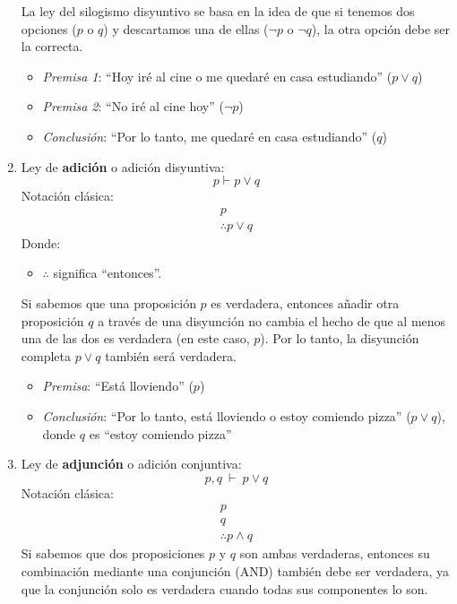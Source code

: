 \begin{enumerate}[label=\alph*)]
	La ley del silogismo disyuntivo se basa en la idea de que si tenemos dos opciones ($p$ o $q$) y descartamos una de ellas ($\neg p$ o $\neg q$), la otra opción debe ser la correcta.
	
	\begin{fmd-example} 
		\begin{itemize}
			\item \textit{Premisa 1}: ``Hoy iré al cine o me quedaré en casa estudiando'' ($p \lor q$)
			\item \textit{Premisa 2}: ``No iré al cine hoy'' ($\neg p$)
			\item \textit{Conclusión}: ``Por lo tanto, me quedaré en casa estudiando'' ($q$)
		\end{itemize}
	\end{fmd-example}
	
	\item Ley de \textbf{adición} o adición disyuntiva: 
	\[ p \vdash p \lor q \]
	Notación clásica:
	\[
	\begin{array}{l}
		p\\ \hline
		\therefore p \lor q
	\end{array}
	\]
	Donde:
	\begin{itemize}
		\item $\therefore$ significa ``entonces''.
	\end{itemize}
	
	Si sabemos que una proposición $p$ es verdadera, entonces añadir otra proposición $q$ a través de una disyunción no cambia el hecho de que al menos una de las dos es verdadera (en este caso, $p$). Por lo tanto, la disyunción completa $p \lor q$ también será verdadera.
	
	\begin{fmd-example}[Adición]
		\begin{itemize}
			\item \textit{Premisa}: ``Está lloviendo'' ($p$)
			\item \textit{Conclusión}: ``Por lo tanto, está lloviendo o estoy comiendo pizza'' ($p \lor q$), donde $q$ es ``estoy comiendo pizza''
		\end{itemize}
	\end{fmd-example}
	
	\item Ley de \textbf{adjunción} o adición conjuntiva:  
	\[ p, q \ \vdash \ p \lor q \]
	Notación clásica:
	\[
	\begin{array}{l}
		p\\
		q\\ \hline
		\therefore p \land q
	\end{array}
	\]
	Si sabemos que dos proposiciones $p$ y $q$ son ambas verdaderas, entonces su combinación mediante una conjunción (AND) también debe ser verdadera, ya que la conjunción solo es verdadera cuando todas sus componentes lo son.
	

\end{enumerate}
